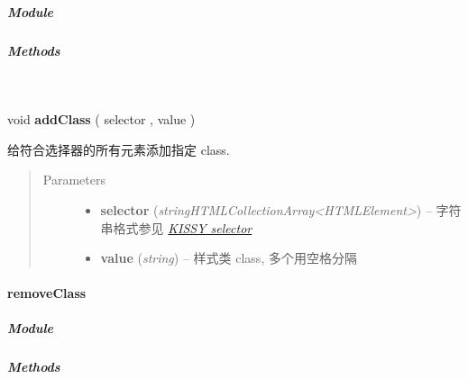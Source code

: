 \documentclass[letterpaper,10pt,english]{sphinxmanual}
\begin{document}
\subparagraph{Module}
\label{api/core/dom/addClass:module}\begin{quote}

{\hyperref[api/core/dom/index:module-DOM]{}}
\end{quote}


\subparagraph{Methods}
\label{api/core/dom/addClass:methods}

\begin{fulllineitems}
\label{api/core/dom/addClass:DOM.addClass}~
\begin{DUlineblock}{0em}
\item[] void \textbf{addClass} ( selector , value )
\item[] 给符合选择器的所有元素添加指定 class.
\end{DUlineblock}
\begin{quote}\begin{description}
\item[{Parameters}] \leavevmode\begin{itemize}
\item {}
\textbf{selector} (\emph{string\textbar{}HTMLCollection\textbar{}Array\textless{}HTMLElement\textgreater{}}) -- 字符串格式参见 {\hyperref[api/core/dom/selector:dom-selector]{\emph{KISSY selector}}}

\item {}
\textbf{value} (\emph{string}) -- 样式类 class, 多个用空格分隔

\end{itemize}

\end{description}\end{quote}

\end{fulllineitems}



\paragraph{removeClass}
\label{api/core/dom/removeClass:removeclass}\label{api/core/dom/removeClass::doc}

\subparagraph{Module}
\label{api/core/dom/removeClass:module}\begin{quote}

{\hyperref[api/core/dom/index:module-DOM]{}}
\end{quote}


\subparagraph{Methods}
\label{api/core/dom/removeClass:methods}
\end{document}
